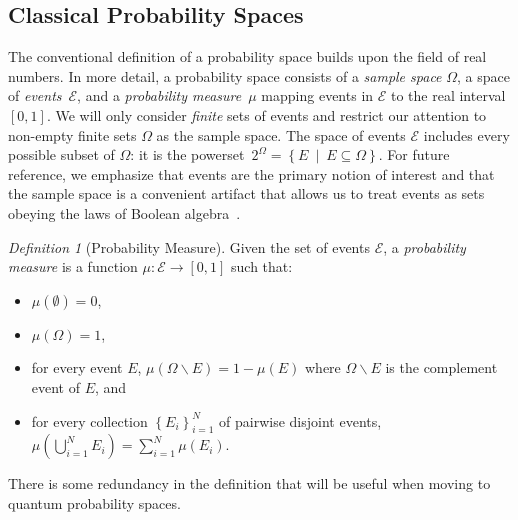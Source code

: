 \documentclass{article}
\theoremstyle{remark}
\newtheorem{definition}{Definition}
\newcommand{\events}{\ensuremath{\mathcal{E}}}
\newcommand{\pmeas}{\ensuremath{\mu}}
\begin{document}
\subsection{Classical Probability Spaces}

The conventional definition of a probability space builds upon the
field of real numbers. In more detail, a probability space consists of
a \emph{sample space} $\Omega$, a space of \emph{events}~$\events$,
and a \emph{probability measure}~$\pmeas$ mapping events in $\events$
to the real interval $[0,1]$. We will only consider \emph{finite} sets
of events and restrict our attention to non-empty finite sets $\Omega$
as the sample space. The space of events $\events$ includes every
possible subset of $\Omega$: it is the
powerset~$2^{\Omega}=\left\{ E ~\middle|~ E\subseteq\Omega\right\}
$.
For future reference, we emphasize that events are the primary notion
of interest and that the sample space is a convenient artifact that
allows us to treat events as sets obeying the laws of Boolean
algebra~\cite{Boole1948,Redhead1987-REDINA,Griffiths2003}.

\begin{definition}[Probability Measure]\label{def:ClassicalProbabilitySpace}
  Given the set of events $\events$, a \emph{probability measure} is a
  function $\pmeas:\events\rightarrow[0,1]$ such that:
\begin{itemize}
\item $\pmeas(\emptyset)=0$,
\item $\pmeas(\Omega)=1$, 
\item for every event $E$,
  $\pmeas\left(\Omega\backslash E\right)=1-\pmeas\left(E\right)$ where
  $\Omega\backslash E$ is the complement event of $E$, and
\item for every collection $\left\{ E_{i}\right\} _{i=1}^{N}$ of
  pairwise disjoint events,
  $\pmeas\left(\bigcup_{i=1}^{N}E_{i}\right)=\sum_{i=1}^{N}\pmeas(E_{i})$.
\end{itemize}
\end{definition}
\noindent There is some redundancy in the definition that will be useful when
moving to quantum probability spaces. 
\end{document}
